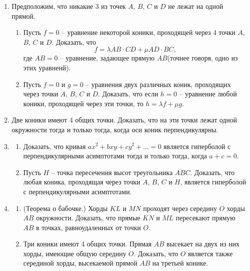 \begin{enumerate}[resume*]
\subsubsection*{4.1.2. Теорема о пучке коник, проходящих через 4 точки}
	\item Предположим, что никакие 3 из точек $A$, $B$, $C$ и $D$ не лежат на одной прямой.
	\begin{enumerate}
		\item Пусть $f = 0$ -- уравнение некоторой коники, проходящей через 4 точки $A$, $B$, $C$ и $D$. Доказать, что
		\[
			f = \lambda AB \cdot CD + \mu AD \cdot BC,
		\]
		где $AB = 0$ -- уравнение, задающее прямую $AB$(точнее говоря, одно из этих уравненй).

		\item Пусть $f = 0$ и $g = 0$ -- уравнения двух различных коник, проходящих через точки $A$, $B$, $C$ и $D$. Доказать, что если $h = 0$ -- уравнение любой коники, проходящей через эти точки, то $h = \lambda f + \mu g$.
	\end{enumerate}

	\item Две коники имеют 4 общих точки. Доказать, что на эти точки лежат одной окружности тогда и только тогда, когда оси коник перпендикулярны.

	\item
	\begin{enumerate}
		\item Доказать, что кривая $ax^2 + bxy + cy^2 + \ldots = 0$ является гиперболой с перпендикулярными асимптотами тогда и только тогда, когда $a + c = 0$.
		\item Пусть $H$ -- точка пересечения высот треугольника $ABC$. Доказать, что любая коника, проходящая через точки $A$, $B$, $C$ и $H$, является гиперболой с перпендикулярными асимптотами.
	\end{enumerate}

	\item
	\begin{enumerate}
		\item (Теорема о бабочке.) Хорды $KL$ и $MN$ проходят через середину $O$ хорды $AB$ окружности. Доказать, что прямые $KN$ и $ML$ пересекают прямую $AB$ в точках, равноудаленных от точки $O$.
		\item Три коники имеют 4 общих точки. Прямая $AB$ высекает на двух из них хорды, имеющие общую середину $O$. Доказать, что $O$ является также серединой хорды, высекаемой прямой $AB$ на третьей конике.
	\end{enumerate}


\end{enumerate}

